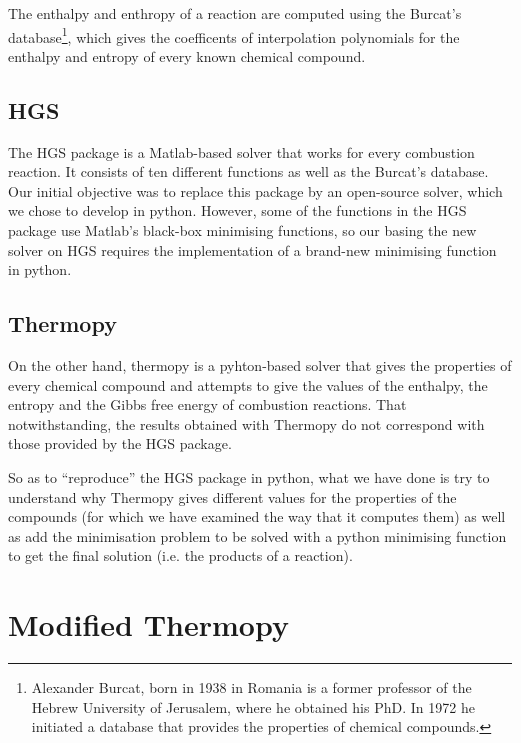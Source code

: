 \documentclass[a4paper,10pt]{article}
\theoremstyle{plain}
\theoremstyle{definition}
\theoremstyle{remark}
\newcommand{\quotes}[1]{``#1''}
\begin{document}
The enthalpy and enthropy of a reaction are computed using the Burcat's database\footnote{Alexander Burcat, born in 1938 in Romania is a former professor of the Hebrew University of Jerusalem, where he obtained his PhD. In 1972 he initiated a database that provides the properties of chemical compounds.}, which gives the coefficents of interpolation polynomials for the enthalpy and entropy of every known chemical compound.
\subsection{HGS}
The HGS package is a Matlab-based solver that works for every combustion reaction. It consists of ten different functions as well as the Burcat's database. Our initial objective was to replace this package by an open-source solver, which we chose to develop in python. However, some of the functions in the HGS package use Matlab's black-box minimising functions, so our basing the new solver on HGS requires the implementation of a brand-new minimising function in python.
\subsection{Thermopy}
On the other hand, thermopy is a pyhton-based solver that gives the properties of every chemical compound and attempts to give the values of the enthalpy, the entropy and the Gibbs free energy of combustion reactions. That notwithstanding, the results obtained with Thermopy do not correspond with those provided by the HGS package.

So as to \quotes{reproduce} the HGS package in python, what we have done is try to understand why Thermopy gives different values for the properties of the compounds (for which we have examined the way that it computes them) as well as add the minimisation problem to be solved with a python minimising function to get the final solution (i.e. the products of a reaction).

\section{Modified Thermopy}
\end{document}
